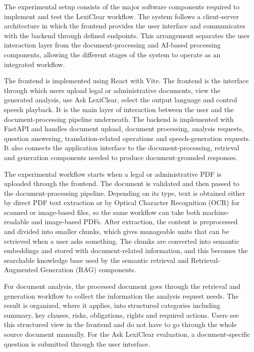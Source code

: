 \documentclass[12pt,a4paper,oneside]{report}
\begin{document}
The experimental setup consists of the major software components required to
implement and test the LexiClear workflow. The system follows a client-server
architecture in which the frontend provides the user interface and communicates
with the backend through defined endpoints. This arrangement separates the
user interaction layer from the document-processing and AI-based processing
components, allowing the different stages of the system to operate as an
integrated workflow.

The frontend is implemented using React with Vite. The frontend is the interface through which users upload legal or administrative documents, view the generated analysis, use Ask LexiClear, select the output language and control speech playback. It is the main layer of interaction between the user and the document-processing pipeline underneath. The backend is implemented with FastAPI and handles document upload, document processing, analysis requests, question answering, translation-related operations and speech-generation requests. It also connects the application interface to the document-processing, retrieval and generation components needed to produce document-grounded responses.

The experimental workflow starts when a legal or administrative PDF is uploaded through the frontend. The document is validated and then passed to the document-processing pipeline. Depending on its type, text is obtained either by direct PDF text extraction or by Optical Character Recognition (OCR) for scanned or image-based files, so the same workflow can take both machine-readable and image-based PDFs. After extraction, the content is preprocessed and divided into smaller chunks, which gives manageable units that can be retrieved when a user asks something. The chunks are converted into semantic embeddings and stored with document-related information, and this becomes the searchable knowledge base used by the semantic retrieval and Retrieval-Augmented Generation (RAG) components.

For document analysis, the processed document goes through the retrieval and generation workflow to collect the information the analysis request needs. The result is organized, where it applies, into structured categories including summary, key clauses, risks, obligations, rights and required actions. Users see this structured view in the frontend and do not have to go through the whole source document manually. For the Ask LexiClear evaluation, a document-specific question is submitted through the user interface.
\end{document}
